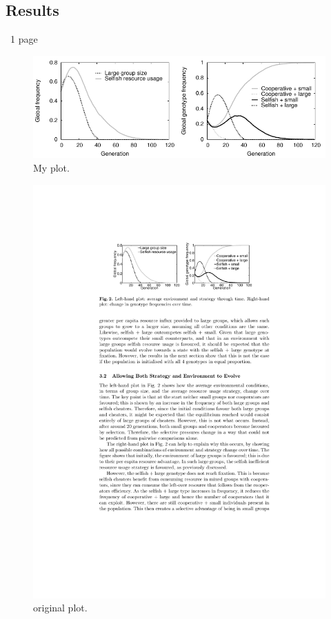 \documentclass[11pt]{article}
\begin{document}
\subsection{Results}
~1 page
\begin{figure}[!ht]
  \centering
  \includegraphics{equalplot.pdf}
  \caption{My plot.}
  \label{Figure:plot}
\end{figure}

\begin{figure}[!ht]
  \centering
  \includegraphics[scale=1.25]{original.pdf}
  \caption{original plot.}
  \label{Figure:original}
\end{figure}
\end{document}
